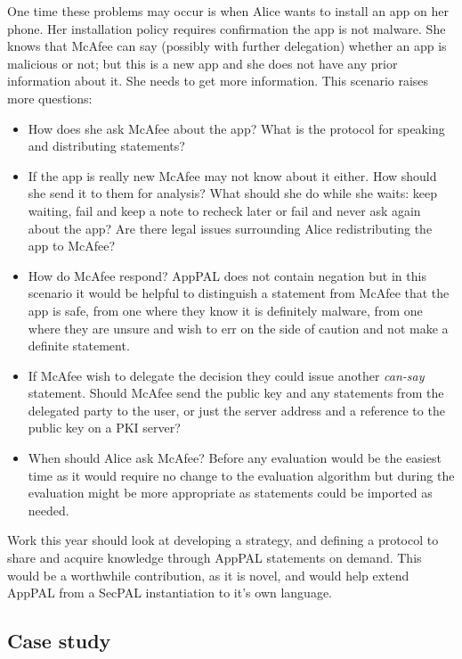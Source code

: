 \documentclass[a4paper]{scrartcl}
\begin{document}
One time these problems may occur is when
Alice wants to install an app on her phone.
Her installation policy requires confirmation the app is not malware.
She knows that McAfee can say (possibly with further delegation) whether an app is malicious or not;
  but this is a new app and she does not have any prior information about it.
She needs to get more information.
This scenario raises more questions:

\begin{itemize}
  \item How does she ask McAfee about the app?  What is the protocol for speaking and distributing statements?
  \item If the app is really new McAfee may not know about it either. How should she send it to them for analysis?  What should she do while she waits: keep waiting, fail and keep a note to recheck later or fail and never ask again about the app?  Are there legal issues surrounding Alice redistributing the app to McAfee?
  \item How do McAfee respond?  AppPAL does not contain negation but in this scenario it would be helpful to distinguish a statement from McAfee that the app is safe, from one where they know it is definitely malware, from one where they are unsure and wish to err on the side of caution and not make a definite statement.
  \item If McAfee wish to delegate the decision they could issue another \emph{can-say} statement.   Should McAfee send the public key and any statements from the delegated party to the user, or just the server address and a reference to the public key on a PKI server?
  \item When should Alice ask McAfee?  Before any evaluation would be the easiest time as it would require no change to the evaluation algorithm but during the evaluation might be more appropriate as statements could be imported as needed.
\end{itemize}

Work this year should look at developing a strategy, and defining a protocol to share and acquire knowledge through AppPAL statements on demand.
This would be a worthwhile contribution, as it is novel, and would help extend AppPAL from a SecPAL instantiation to it's own language.


\subsection{Case study}
\end{document}
